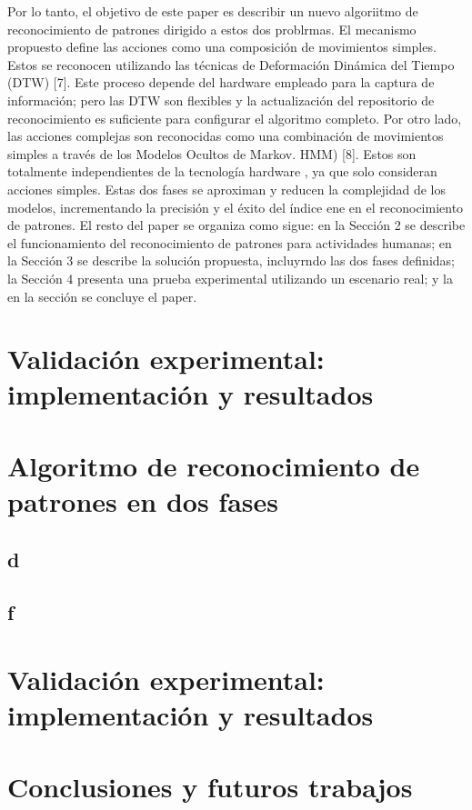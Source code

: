 \documentclass{article}
\begin{document}
Por lo tanto, el objetivo de este paper es describir un nuevo algoriitmo de reconocimiento de patrones dirigido a estos dos problrmas. El mecanismo propuesto define las acciones como una composición de movimientos simples. Estos se reconocen utilizando las técnicas de Deformación Dinámica del Tiempo (DTW) [7]. Este proceso depende del hardware empleado para la captura de información; pero las DTW son flexibles y la actualización del repositorio de reconocimiento es suficiente para configurar el algoritmo completo. Por otro lado, las acciones complejas son reconocidas como una combinación de movimientos simples a través de los Modelos Ocultos de Markov. HMM) [8]. Estos son totalmente independientes de la tecnología hardware , ya que solo consideran acciones simples. Estas dos fases  se aproximan y reducen la complejidad de los modelos, incrementando la precisión y el éxito del índice ene en el reconocimiento de patrones.
El resto del paper se organiza como sigue: en la Sección 2 se describe el funcionamiento del reconocimiento de patrones para actividades humanas; en la Sección 3 se describe la solución propuesta, incluyrndo las dos fases definidas; la Sección 4 presenta una prueba  experimental utilizando un escenario real; y la en la sección se concluye el paper.
\section {Validación experimental: implementación y resultados}
\section {Algoritmo de reconocimiento de patrones en dos fases}
\subsection{d}
\subsection{f}
\section {Validación experimental: implementación y resultados}
\section {Conclusiones y futuros trabajos}
\end{document}
